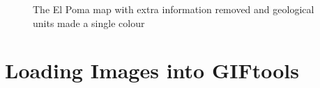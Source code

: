  \begin{figure} [h]
    \centering
    \caption{The El Poma map with extra information removed and geological units made a single colour}
    \label{fig:ElPoma_GEOL_MagSus_M2M_downsample8}
\end{figure}

\FloatBarrier
\section{Loading Images into GIFtools}
\label{sec:Load Images into GIFtools}

